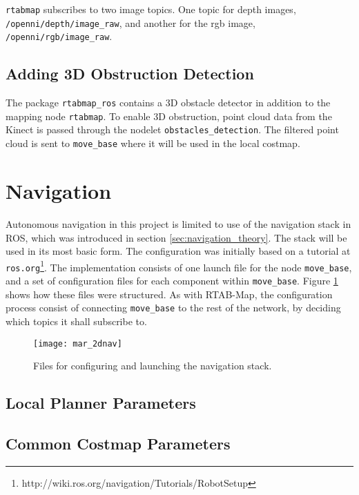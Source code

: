 \texttt{rtabmap} subscribes to two image topics. One topic for depth images, \texttt{/openni/depth/image\_raw}, and another for the rgb image, \texttt{/openni/rgb/image\_raw}. 

\subsection{Adding 3D Obstruction Detection}

The package \texttt{rtabmap\_ros} contains a 3D obstacle detector in addition to the mapping node \texttt{rtabmap}. To enable 3D obstruction, point cloud data from the Kinect is passed through the nodelet \texttt{obstacles\_detection}. The filtered point cloud is sent to \texttt{move\_base} where it will be used in the local costmap.

\section{Navigation}
\label{sec:navigation}
Autonomous navigation in this project is limited to use of the navigation stack in \ac{ROS}, which was introduced in section \ref{sec:navigation_theory}. The stack will be used in its most basic form. The configuration was initially based on a tutorial at \texttt{ros.org}\footnote{http://wiki.ros.org/navigation/Tutorials/RobotSetup}. The implementation consists of one launch file for the node \texttt{move\_base}, and a set of configuration files for each component within \texttt{move\_base}. Figure \ref{fig:mar_2dnav} shows how these files were structured. As with \ac{RTAB-Map}, the configuration process consist of connecting \texttt{move\_base} to the rest of the network, by deciding which topics it shall subscribe to. 

\begin{figure}[h]
	\centering
	\texttt{[image: mar\_2dnav]}
	\caption{Files for configuring and launching the navigation stack.}
	\label{fig:mar_2dnav}
\end{figure}

\subsection{Local Planner Parameters}

\subsection{Common Costmap Parameters}

